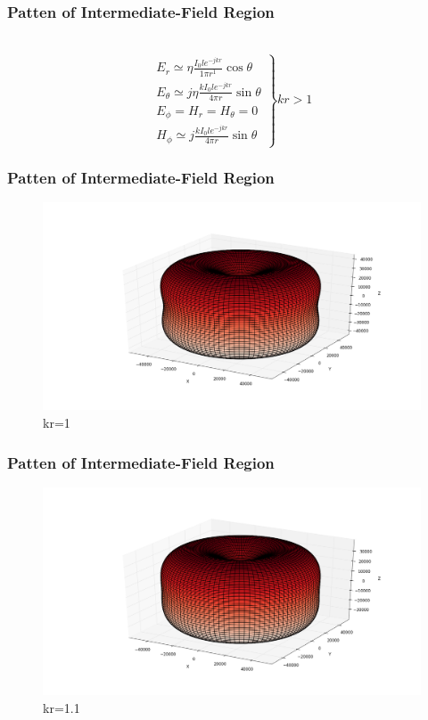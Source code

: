 \documentclass[compress=true]{beamer}
\begin{document}
\begin{frame}
  \frametitle{Patten of Intermediate-Field Region}
  \begin{block}{~}
  \begin{equation}
    \left.
      \begin{array}{l}
        E_r \simeq {\eta}\frac{I_0le^{-jkr}}{1\pi r^1}\cos{\theta}\\
        E_{\theta} \simeq j{\eta}\frac{kI_0le^{-jkr}}{4\pi r}\sin{\theta}\\
        E_{\phi}=H_r=H_{\theta}=0\\
        H_{\phi}\simeq j\frac{kI_0le^{-jkr}}{4\pi r}\sin{\theta}
      \end{array}
    \right\} kr>1 
  \end{equation}
\end{block}
\end{frame}
\begin{frame}
  \frametitle{Patten of Intermediate-Field Region}
  \begin{figure}
    \includegraphics[height=0.68\textheight]{inter_kr_1_1.png}
    \caption*{\tiny{kr=1}}
  \end{figure}
\end{frame}
\begin{frame}
  \frametitle{Patten of Intermediate-Field Region}
  \begin{figure}
    \includegraphics[height=0.68\textheight]{inter_kr_1_1_1.png}
    \caption*{\tiny{kr=1.1}}
  \end{figure}
\end{frame}
\end{document}
